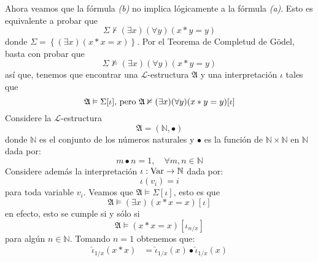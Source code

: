 \documentclass[12pt]{article}
\newcounter{it}
\theoremstyle{largebreak}
\newcommand\cf[3]{\ensuremath{#1:#2\rightarrow#3}}
\begin{document}
\begin{sol}
        Ahora veamos que la fórmula \textit{(b)} no implica lógicamente a la fórmula \textit{(a)}. Esto es equivalente a probar que
        \begin{equation*}
            \Sigma\nvdash (\exists x)(\forall y)(x*y=y)
        \end{equation*}
        donde $\Sigma=\left\{(\exists x)(x*x=x) \right\}$. Por el Teorema de Completud de Gödel, basta con probar que
        \begin{equation*}
            \Sigma\nvDash (\exists x)(\forall y)(x*y=y)
        \end{equation*}
        así que, tenemos que encontrar una $\mathcal{L}$-estructura $\mathfrak{A}$ y una interpretación $\iota$ tales que
        \begin{equation*}
            \mathfrak{A}\vDash\Sigma[\iota]\textup{, pero }\mathfrak{A}\nvDash (\exists x)(\forall y)(x*y=y)[\iota]
        \end{equation*}
        Considere la $\mathcal{L}$-estructura
        \begin{equation*}
            \mathfrak{A}=(\mathbb{N},\bullet)
        \end{equation*}
        donde $\mathbb{N}$ es el conjunto de los números naturales y $\bullet$ es la función de $\mathbb{N}\times\mathbb{N}$ en $\mathbb{N}$ dada por:
        \begin{equation*}
            m\bullet n=1,\quad\forall m,n\in\mathbb{N}
        \end{equation*}
        Considere además la interpretación $\cf{\iota}{\textup{Var}}{\mathbb{N}}$ dada por:
        \begin{equation*}
            \iota(v_i)=i
        \end{equation*}
        para toda variable $v_i$. Veamos que $\mathfrak{A}\vDash\Sigma[\iota]$, esto es que
        \begin{equation*}
            \mathfrak{A}\vDash(\exists x)(x*x=x)[\iota]
        \end{equation*}
        en efecto, esto se cumple si y sólo si
        \begin{equation*}
            \mathfrak{A}\vDash(x*x=x)[\iota_{n/x}]
        \end{equation*}
        para algún $n\in\mathbb{N}$. Tomando $n=1$ obtenemos que:
        \begin{equation*}
            \begin{split}
                \hat{\iota}_{1/x}(x*x)&=\hat{\iota}_{1/x}(x)\bullet\hat{\iota}_{1/x}(x)\\

\end{split}
\end{equation*}
\end{sol}
\end{document}
